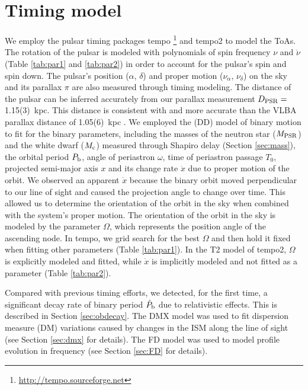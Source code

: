 \section{Timing model}
\label{sec:model}
We employ the pulsar timing packages {\sc tempo}
\footnote{\url{http://tempo.sourceforge.net}} and {\sc tempo2} \citep{hem06} to model the ToAs. 
The rotation of the pulsar is modeled with polynomials of spin frequency 
$\nu$ and $\dot{\nu}$ (Table \ref{tab:par1} and \ref{tab:par2}) in order to account
for the pulsar's spin and spin down.
The pulsar's position ($\alpha$, $\delta$) and proper motion ($\nu_\alpha$, $
\nu_\delta$) on the sky and its parallax $\pi$ are also measured through timing modeling. 
The distance of the pulsar can be inferred accurately from our parallax
measurement $D_{\rm PSR}=$1.15(3)~kpc. This distance is consistent with and
more accurate than the VLBA parallax distance of 1.05(6)~kpc \citep{cbv+09}.
We employed the \citet{dd86} (DD) model of binary motion to fit for the binary parameters, 
including the masses of
the neutron star ($M_{\rm PSR}$) and the white dwarf ($M_{\rm c}$) measured
through Shapiro delay (Section \ref{sec:mass}),
the orbital period $P_{\rm b}$, angle of periastron $\omega$, time of
periastron passage $T_0$, projected semi-major axis $x$ and its change rate
$\dot{x}$ due to proper motion of the orbit. 
We observed an apparent $\dot{x}$ because the binary orbit moved perpendicular
to our line of sight and caused the projection angle to change over time. This 
allowed us to determine the orientation of the orbit in the sky when combined
with the system's proper motion.
The orientation of the orbit in the sky is modeled by the
parameter $\Omega$, which represents the position angle of the ascending node.
In {\sc tempo}, we grid search for the best $\Omega$ and then hold it fixed when fitting other
parameters (Table \ref{tab:par1}).
In the T2 model of {\sc tempo2}, $\Omega$ is explicitly modeled and
fitted, while $\dot{x}$ is implicitly modeled and not fitted as a parameter
(Table \ref{tab:par2}).  
%


%
Compared with previous timing efforts, we detected, for the first time, a
significant decay rate of binary period $\dot{P}_{\rm b}$ due to relativistic
effects. This is described in Section \ref{sec:obdecay}.    
The DMX model was used to fit dispersion measure (DM) variations caused by
changes in the ISM along the line of sight (see Section \ref{sec:dmx} for details). The FD model was used to model profile
evolution in frequency (see Section \ref{sec:FD} for details). 

